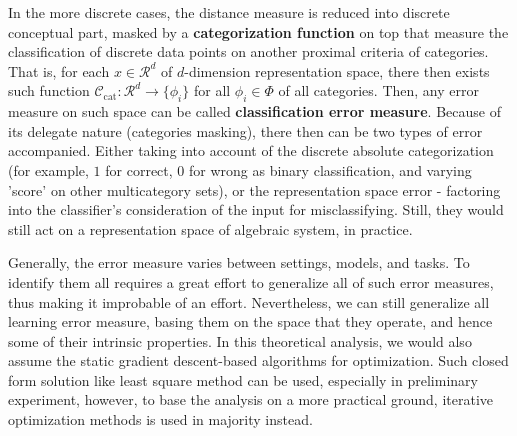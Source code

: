 \documentclass{article}
\begin{document}
In the more discrete cases, the distance measure is reduced into discrete conceptual part, masked by a \textbf{categorization function} on top that measure the classification of discrete data points on another proximal criteria of categories. That is, for each $x\in \mathcal{R}^{d}$ of $d$-dimension representation space, there then exists such function $\mathcal{C}_{\mathrm{cat}}: \mathcal{R}^{d}\to \{\phi_{i}\}$ for all $\phi_{i}\in \Phi$ of all categories. Then, any error measure on such space can be called \textbf{classification error measure}. Because of its delegate nature (categories masking), there then can be two types of error accompanied. Either taking into account of the discrete absolute categorization (for example, $1$ for correct, $0$ for wrong as binary classification, and varying 'score' on other multicategory sets), or the representation space error - factoring into the classifier's consideration of the input for misclassifying. Still, they would still act on a representation space of algebraic system, in practice. 

Generally, the error measure varies between settings, models, and tasks. To identify them all requires a great effort to generalize all of such error measures, thus making it improbable of an effort. Nevertheless, we can still generalize all learning error measure, basing them on the space that they operate, and hence some of their intrinsic properties. In this theoretical analysis, we would also assume the static gradient descent-based algorithms for optimization. Such closed form solution like least square method can be used, especially in preliminary experiment, however, to base the analysis on a more practical ground, iterative optimization methods is used in majority instead. 
\end{document}
